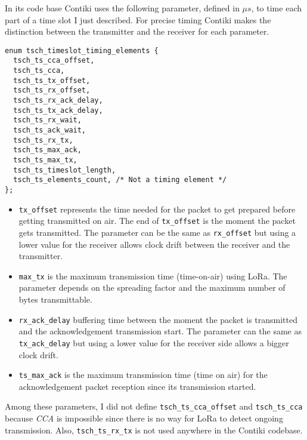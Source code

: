 

In its code base Contiki uses the following parameter, defined in
$\mu s$, to time each part of a time slot I just described.
For precise timing Contiki makes the distinction between the transmitter
and the receiver for each parameter.

\begin{lstlisting}
enum tsch_timeslot_timing_elements {
  tsch_ts_cca_offset,
  tsch_ts_cca,
  tsch_ts_tx_offset,
  tsch_ts_rx_offset,
  tsch_ts_rx_ack_delay,
  tsch_ts_tx_ack_delay,
  tsch_ts_rx_wait,
  tsch_ts_ack_wait,
  tsch_ts_rx_tx,
  tsch_ts_max_ack,
  tsch_ts_max_tx,
  tsch_ts_timeslot_length,
  tsch_ts_elements_count, /* Not a timing element */
};
\end{lstlisting}

\begin{itemize}
  \item \lstinline{tx_offset} represents the time needed for the packet to get
    prepared before getting transmitted on air. The end of
    \lstinline{tx_offset} is the moment the packet gets transmitted.
    The parameter can be the same as \lstinline{rx_offset} but using a lower value
    for the receiver allows clock drift between the receiver and the transmitter.
  \item \lstinline{max_tx} is the maximum transmission time (time-on-air) using
    LoRa. The parameter depends on the spreading factor and the maximum number
    of bytes transmittable.
  \item \lstinline{rx_ack_delay} buffering time between the moment the packet
    is transmitted and the acknowledgement transmission start.
    The parameter can the same as \lstinline{tx_ack_delay} but using a lower value
    for the receiver side allows a bigger clock drift.
  \item \lstinline{ts_max_ack} is the maximum transmission time (time on air) for
    the acknowledgement packet reception since its transmission started.
\end{itemize}

Among these parameters, I did not define \lstinline{tsch_ts_cca_offset} and
\lstinline{tsch_ts_cca} because \emph{CCA} is impossible since there is no way
for LoRa to detect ongoing transmission.
Also, \lstinline{tsch_ts_rx_tx} is not used anywhere in the Contiki codebase.

\paragraph{}

